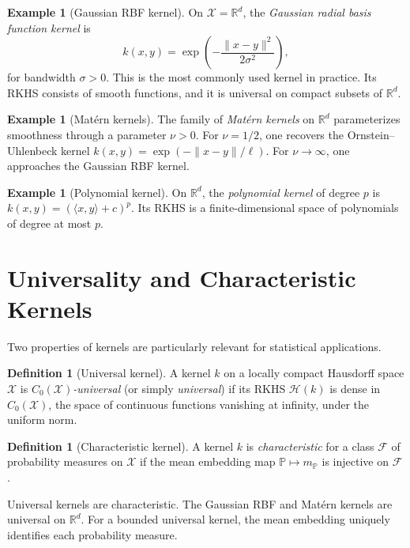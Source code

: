 \documentclass[12pt, oneside]{book}
\theoremstyle{plain}
\theoremstyle{definition}
\newtheorem{definition}[theorem]{Definition}
\newtheorem{example}[theorem]{Example}
\newcommand{\R}{\mathbb{R}}
\newcommand{\calH}{\mathcal{H}}
\newcommand{\calX}{\mathcal{X}}
\newcommand{\PP}{\mathbb{P}}
\begin{document}
\begin{example}[Gaussian RBF kernel]
On $\calX = \R^d$, the \emph{Gaussian radial basis function kernel} is
\begin{equation}
k(x, y) = \exp\!\left(-\frac{\|x-y\|^2}{2\sigma^2}\right),
\end{equation}
for bandwidth $\sigma > 0$. This is the most commonly used kernel in practice. Its RKHS consists of smooth functions, and it is universal on compact subsets of $\R^d$.
\end{example}

\begin{example}[Matérn kernels]
The family of \emph{Matérn kernels} on $\R^d$ parameterizes smoothness through a parameter $\nu > 0$. For $\nu = 1/2$, one recovers the Ornstein--Uhlenbeck kernel $k(x,y) = \exp(-\|x-y\|/\ell)$. For $\nu \to \infty$, one approaches the Gaussian RBF kernel.
\end{example}

\begin{example}[Polynomial kernel]
On $\R^d$, the \emph{polynomial kernel} of degree $p$ is $k(x, y) = (\langle x, y \rangle + c)^p$. Its RKHS is a finite-dimensional space of polynomials of degree at most $p$.
\end{example}

\section{Universality and Characteristic Kernels}

Two properties of kernels are particularly relevant for statistical applications.

\begin{definition}[Universal kernel]
A kernel $k$ on a locally compact Hausdorff space $\calX$ is \emph{$C_0(\calX)$-universal} (or simply \emph{universal}) if its RKHS $\calH(k)$ is dense in $C_0(\calX)$, the space of continuous functions vanishing at infinity, under the uniform norm.
\end{definition}

\begin{definition}[Characteristic kernel]
A kernel $k$ is \emph{characteristic} for a class $\mathcal{F}$ of probability measures on $\calX$ if the mean embedding map $\PP \mapsto m_\PP$ is injective on $\mathcal{F}$.
\end{definition}

Universal kernels are characteristic. The Gaussian RBF and Matérn kernels are universal on $\R^d$. For a bounded universal kernel, the mean embedding uniquely identifies each probability measure.
\end{document}
